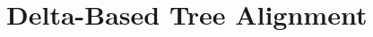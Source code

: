 \documentclass[numbers]{sigplanconf}
\newcommand{\Conid}[1]{\mathit{#1}}
\newcommand{\Varid}[1]{\mathit{#1}}
\def\resethooks{%
  \global\let\SaveRestoreHook\empty
  \global\let\ColumnHook\empty}
\newlength{\blanklineskip}
\newcommand{\hsindent}[1]{\quad}%
\begin{document}

\section{Delta-Based Tree Alignment}
\end{document}
